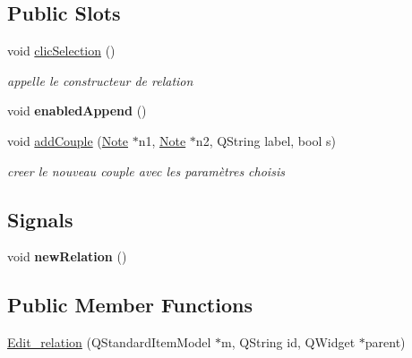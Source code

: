\subsection*{Public Slots}
\begin{DoxyCompactItemize}
\item 
\mbox{\label{class_edit__relation_ab8b401c68bf851bea39fc38fbce0f9f5}} 
void \hyperlink{class_edit__relation_ab8b401c68bf851bea39fc38fbce0f9f5}{clic\+Selection} ()
\begin{DoxyCompactList}\small\item\em appelle le constructeur de relation \end{DoxyCompactList}\item 
\mbox{\label{class_edit__relation_a558f8134fbd20281e24ceb350882ddaf}} 
void {\bfseries enabled\+Append} ()
\item 
void \hyperlink{class_edit__relation_a06254b8a5265ba82160c6ab62bbf9101}{add\+Couple} (\hyperlink{class_note}{Note} $\ast$n1, \hyperlink{class_note}{Note} $\ast$n2, Q\+String label, bool s)
\begin{DoxyCompactList}\small\item\em creer le nouveau couple avec les paramètres choisis \end{DoxyCompactList}\end{DoxyCompactItemize}
\subsection*{Signals}
\begin{DoxyCompactItemize}
\item 
\mbox{\label{class_edit__relation_a39ece696a8813495b806fcd5cc8ec51c}} 
void {\bfseries new\+Relation} ()
\end{DoxyCompactItemize}
\subsection*{Public Member Functions}
\begin{DoxyCompactItemize}
\item 
\hyperlink{class_edit__relation_aea8577d292461d142c4087fd5446a48c}{Edit\+\_\+relation} (Q\+Standard\+Item\+Model $\ast$m, Q\+String id, Q\+Widget $\ast$parent)
\end{DoxyCompactItemize}


